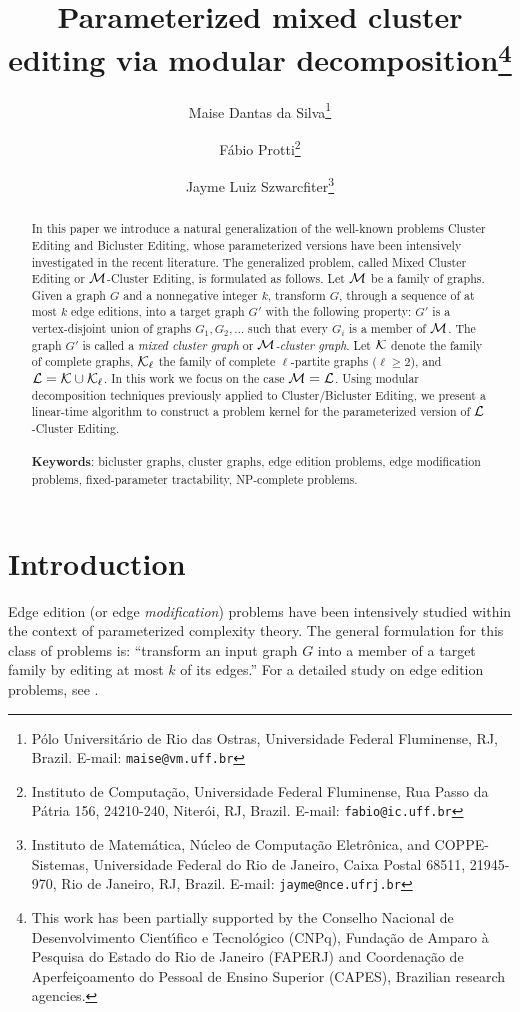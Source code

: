 \documentclass[12pt]{article}
\title{Parameterized mixed cluster editing via modular decomposition\footnote{This work has been partially supported by the
 Conselho Nacional de Desenvolvimento Cient\'{\i}fico e Tecnol\'{o}gico (CNPq), Funda\c c\~ao de Amparo \`a Pesquisa do
 Estado do Rio de Janeiro (FAPERJ) and Coordena\c c\~ao de Aperfei\c coamento do Pessoal de Ensino Superior (CAPES),
 Brazilian research agencies.}}
\author{Maise Dantas da Silva\footnote{P\'{o}lo Universit\'{a}rio de Rio das Ostras, Universidade Federal Fluminense, RJ, Brazil.
E-mail: {\tt maise@vm.uff.br}} \and F\'abio Protti\footnote{Instituto de Computa\c c\~ao, Universidade Federal Fluminense, Rua Passo da P\'{a}tria 156, 24210-240, Niter\'oi,
RJ, Brazil. E-mail: {\tt fabio@ic.uff.br}} \and  Jayme Luiz
Szwarcfiter\footnote{Instituto de Matem\'atica, N\'ucleo de
Computa\c c\~ao Eletr\^onica, and COPPE-Sistemas, Universidade
Federal do Rio de Janeiro, Caixa Postal 68511, 21945-970, Rio de
Janeiro, RJ, Brazil. E-mail: {\tt jayme@nce.ufrj.br}}}
\def\M{{\cal M}}
\def\L{{\cal L}}
\def\KL{{\cal K}_{\ell}}
\begin{document}
\newtheorem{teo}{Theorem}\newtheorem{lema}[teo]{Lemma}
\newtheorem{cor}[teo]{Corollary}
\newtheorem{prop}[teo]{Proposition}
\newtheorem{obs}[teo]{Remark}
\newtheorem{defin}[teo]{Definition}


\maketitle

\begin{abstract}

In this paper we introduce a natural generalization of the well-known problems {\sc Cluster Editing} and {\sc Bicluster Editing}, whose parameterized versions have been intensively investigated in the recent literature. The generalized problem, called {\sc Mixed Cluster Editing} or $\M${\sc -Cluster Editing}, is formulated as follows. Let $\M$ be a family of graphs. Given a graph $G$ and a nonnegative integer $k$, transform $G$, through a sequence of at most $k$ edge editions, into a target graph $G'$ with the following property: $G'$ is a vertex-disjoint union of graphs $G_1, G_2, \ldots$ such that every $G_i$ is a member of $\M$. The graph $G'$ is called a {\em mixed cluster graph} or $\M${\em -cluster graph}. Let ${\cal K}$ denote the family of complete graphs, $\KL$ the family of complete $\ell$-partite graphs ($\ell \geq 2$), and
$\L={\cal K} \cup \KL$. In this work we focus on the case $\M = \L$. Using modular decomposition techniques previously applied to {\sc Cluster/Bicluster Editing}, we present a linear-time algorithm to construct a problem kernel for the parameterized version of $\L${\sc -Cluster Editing}.\\ \\
\textbf{Keywords}: bicluster graphs, cluster graphs, edge edition problems, edge modification problems, fixed-parameter tractability, NP-complete problems.
\end{abstract}

\section{Introduction} \label{sec1}

Edge edition (or edge {\em modification}) problems have been intensively studied within
the context of parameterized complexity theory. The general
formulation for this class of problems is: ``transform an input
graph $G$ into a member of a target family
by editing at most $k$ of its edges.'' For a detailed study on
edge edition problems, see \cite{NSS99}.
\end{document}
